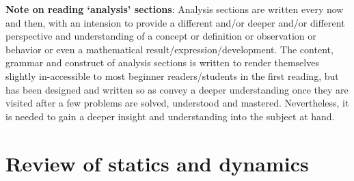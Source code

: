 \documentclass[]{book}
\begin{document}
\textbf{Note on reading `analysis' sections}: Analysis sections are written every now and then, with an intension to provide a different and/or deeper and/or different perspective and understanding of a concept or definition or observation or behavior or even a mathematical result/expression/development. The content, grammar and construct of analysis sections is written to render themselves slightly in-accessible to most beginner readers/students in the first reading, but has been designed and written so as convey a deeper understanding once they are visited after a few problems are  solved, understood and mastered. Nevertheless, it is needed to gain a deeper insight and understanding into the subject at hand.
\part{Review of statics and dynamics} %
\end{document}

